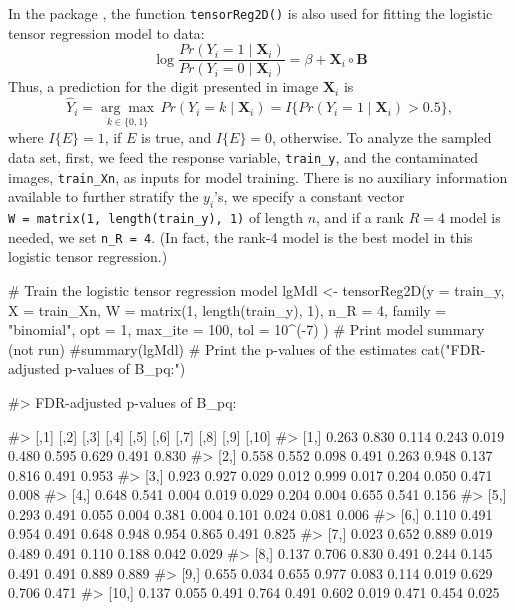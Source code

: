 In the package , the function
\texttt{tensorReg2D()} is also used for fitting the logistic tensor
regression model to data: \[
\log{\frac{Pr(Y_i = 1\mid\mathbf{X}_i)}{Pr(Y_i = 0\mid\mathbf{X}_i)}} = \beta +  \mathbf{X}_i \circ \mathbf{B}
\] Thus, a prediction for the digit presented in image \(\mathbf{X}_i\)
is \[
  \hat Y_i = \underset{k \in \{0,1\}}{\arg\max}\,{Pr(Y_i = k\mid\mathbf{X}_i)} = I\{Pr(Y_i = 1\mid\mathbf{X}_i) > 0.5\},
\] where \(I\{E\} = 1\), if \(E\) is true, and \(I\{E\} = 0\),
otherwise. To analyze the sampled data set, first, we feed the response
variable, \texttt{train\_y}, and the contaminated images,
\texttt{train\_Xn}, as inputs for model training. There is no auxiliary
information available to further stratify the \(y_i\)'s, we specify a
constant vector \texttt{W\ =\ matrix(1,\ length(train\_y),\ 1)} of
length \(n\), and if a rank \(R = 4\) model is needed, we set
\texttt{n\_R\ =\ 4}. (In fact, the rank-4 model is the best model in
this logistic tensor regression.)

\begin{Schunk}
\begin{Sinput}
# Train the logistic tensor regression model
lgMdl <- tensorReg2D(y = train_y, X = train_Xn, 
                      W = matrix(1, length(train_y), 1),
                      n_R = 4, family = "binomial", 
                      opt = 1, max_ite = 100, tol = 10^(-7) )
# Print model summary (not run)
#summary(lgMdl)
# Print the p-values of the estimates
cat("FDR-adjusted p-values of B_pq:\n")
\end{Sinput}
\begin{Soutput}
#> FDR-adjusted p-values of B_pq:
\end{Soutput}
\begin{Soutput}
#>        [,1]  [,2]  [,3]  [,4]  [,5]  [,6]  [,7]  [,8]  [,9] [,10]
#>  [1,] 0.263 0.830 0.114 0.243 0.019 0.480 0.595 0.629 0.491 0.830
#>  [2,] 0.558 0.552 0.098 0.491 0.263 0.948 0.137 0.816 0.491 0.953
#>  [3,] 0.923 0.927 0.029 0.012 0.999 0.017 0.204 0.050 0.471 0.008
#>  [4,] 0.648 0.541 0.004 0.019 0.029 0.204 0.004 0.655 0.541 0.156
#>  [5,] 0.293 0.491 0.055 0.004 0.381 0.004 0.101 0.024 0.081 0.006
#>  [6,] 0.110 0.491 0.954 0.491 0.648 0.948 0.954 0.865 0.491 0.825
#>  [7,] 0.023 0.652 0.889 0.019 0.489 0.491 0.110 0.188 0.042 0.029
#>  [8,] 0.137 0.706 0.830 0.491 0.244 0.145 0.491 0.491 0.889 0.889
#>  [9,] 0.655 0.034 0.655 0.977 0.083 0.114 0.019 0.629 0.706 0.471
#> [10,] 0.137 0.055 0.491 0.764 0.491 0.602 0.019 0.471 0.454 0.025
\end{Soutput}
\end{Schunk}

